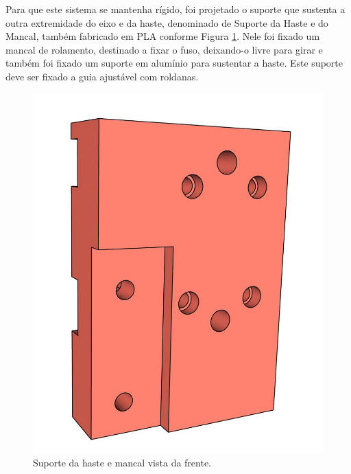 \pagebreak

Para que este sistema se mantenha rígido, foi projetado o suporte que sustenta a outra 
extremidade do eixo e da haste, denominado de Suporte da Haste e do Mancal, também 
fabricado em \ac{PLA} conforme Figura \ref{fig:ressuportehastemancalf}. Nele foi fixado um 
mancal de rolamento, destinado a fixar o fuso, deixando-o livre para girar e também foi 
fixado um suporte em alumínio para sustentar a haste. Este suporte deve ser fixado a 
guia ajustável com roldanas.

\begin{figure}[H]
\centering
\caption{Suporte da haste e mancal vista da frente.}\label{fig:ressuportehastemancalf}
\includegraphics[scale = 0.4]{figuras/ressuportehastemancalf}
\end{figure}
    
